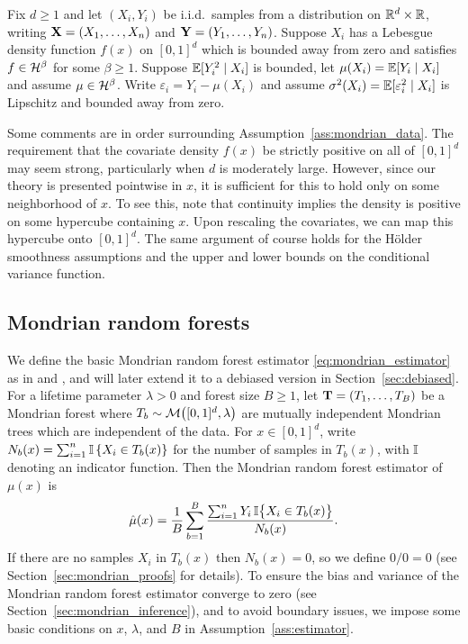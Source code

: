 \begin{assumption}%
  \label{ass:mondrian_data}

  Fix $d \geq 1$ and let $(X_i, Y_i)$ be i.i.d.\ samples from a distribution on
  $\mathbb{R}^d \times \mathbb{R}$, writing $\mathbf{X} = (X_1, \ldots, X_n)$ and
  $\mathbf{Y} = (Y_1, \ldots, Y_n)$. Suppose $X_i$ has a Lebesgue density function
  $f(x)$ on $[0,1]^d$ which is bounded away from zero and satisfies
  $f \in \mathcal{H}^\beta$ for some $\beta \geq 1$. Suppose $\mathbb{E}[Y_i^2 \mid X_i]$ is
  bounded, let $\mu(X_i) = \mathbb{E}[Y_i \mid X_i]$ and assume $\mu \in \mathcal{H}^\beta$.
  Write $\varepsilon_i = Y_i - \mu(X_i)$ and assume
  $\sigma^2(X_i) = \mathbb{E}[\varepsilon_i^2 \mid X_i]$
  is Lipschitz and bounded away from zero.

\end{assumption}

Some comments are in order surrounding Assumption~\ref{ass:mondrian_data}. The
requirement that the covariate density $f(x)$ be strictly positive on all of
$[0,1]^d$ may seem strong, particularly when $d$ is moderately large. However,
since our theory is presented pointwise in $x$, it is sufficient for this to
hold only on some neighborhood of $x$. To see this, note that continuity
implies the density is positive on some hypercube containing $x$. Upon
rescaling the covariates, we can map this hypercube onto $[0,1]^d$. The same
argument of course holds for the H{\"o}lder smoothness assumptions and the
upper and lower bounds on the conditional variance function.

\subsection{Mondrian random forests}
\label{sec:mondrian_forests}

We define the basic Mondrian random forest estimator
\eqref{eq:mondrian_estimator} as in \citet{lakshminarayanan2014mondrian} and
\citet{mourtada2020minimax}, and will later extend it to a debiased version in
Section~\ref{sec:debiased}. For a lifetime parameter $\lambda > 0$ and forest
size $B \geq 1$, let $\mathbf{T} = (T_1, \ldots, T_B)$ be a Mondrian forest where
$T_b \sim \mathcal{M}\big([0,1]^d, \lambda\big)$ are mutually independent Mondrian trees
which are independent of the data. For $x \in [0,1]^d$, write
$N_b(x) = \sum_{i=1}^{n} \mathbb{I} \left\{ X_i \in T_b(x) \right\}$ for the number of
samples in $T_b(x)$, with $\mathbb{I}$ denoting an indicator function. Then the
Mondrian random forest estimator of $\mu(x)$ is
%
\begin{align}
  \label{eq:mondrian_estimator}
  \hat\mu(x) = \frac{1}{B} \sum_{b=1}^B
  \frac{\sum_{i=1}^n Y_i \, \mathbb{I}\big\{ X_i \in T_b(x) \big\}} {N_b(x)}.
\end{align}
%
If there are no samples $X_i$ in $T_b(x)$ then $N_b(x) = 0$, so we define
$0/0 = 0$ (see Section~\ref{sec:mondrian_proofs} for details). To ensure the
bias and variance of the Mondrian random forest estimator converge to zero (see
Section~\ref{sec:mondrian_inference}), and to avoid boundary issues, we impose
some basic conditions on $x$, $\lambda$, and $B$ in
Assumption~\ref{ass:estimator}.

